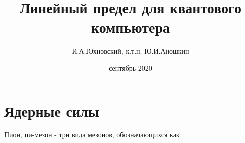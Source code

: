 \documentclass[11pt]{report}
\title{\textbf{Линейный предел для квантового компьютера}}
\author{И.А.Юхновский, к.т.н. Ю.И.Аношкин}
\date{сентябрь 2020}
\begin{document}
\section {Ядерные силы}

Пион, пи-мезон - три вида мезонов, обозначающихся как 
 
\end{document}
